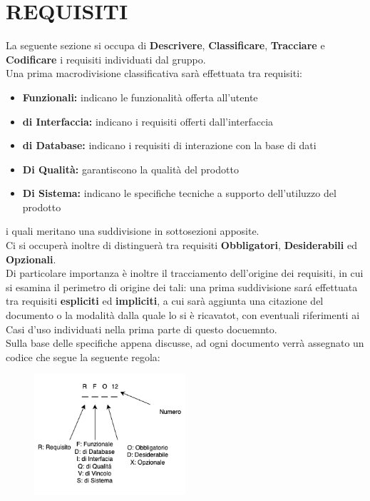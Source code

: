 \section{REQUISITI}\label{sec:requisiti}
La seguente sezione si occupa di \textbf{Descrivere}, \textbf{Classificare}, \textbf{Tracciare} e \textbf{Codificare}
i requisiti individuati dal gruppo. \\
Una prima macrodivisione classificativa sarà effettuata tra requisiti:
\begin{itemize}
    \item \textbf{Funzionali: }indicano le funzionalità offerta all'utente
    \item \textbf{di Interfaccia: }indicano i requisiti offerti dall'interfaccia
    \item \textbf{di Database: }indicano i requisiti di interazione con la base di dati
    \item \textbf{Di Qualità: } garantiscono la qualità del prodotto
    \item \textbf{Di Sistema: }indicano le specifiche tecniche a supporto dell'utiluzzo del prodotto
\end{itemize}
i quali meritano una suddivisione in sottosezioni apposite.\\
Ci si occuperà inoltre di distinguerà tra requisiti \textbf{Obbligatori}, \textbf{Desiderabili} ed \textbf{Opzionali}.\\ 
Di particolare importanza è inoltre il tracciamento dell'origine dei requisiti, in cui si esamina il perimetro di origine dei tali: una prima suddivisione sará effettuata tra requisiti \textbf{espliciti} ed \textbf{impliciti}, a cui sarà aggiunta una citazione del documento o la modalità dalla quale lo si è ricavatot, con eventuali riferimenti ai Casi d'uso individuati nella prima parte di questo docuemnto.\\
Sulla base delle specifiche appena discusse, ad ogni documento verrà assegnato un codice che segue la seguente regola:

\begin{figure}[h]
 \centering
  \includegraphics[width=0.5\textwidth]{UseCasesImages/requirementsCod.png}
\end{figure}

